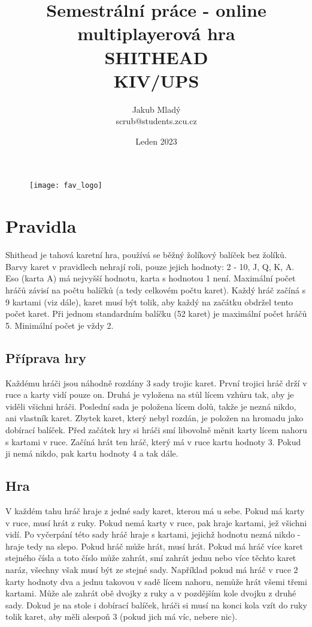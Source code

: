 \documentclass{article}
\title{%
Semestrální práce - online multiplayerová hra\\
SHITHEAD\\
\large KIV/UPS
}
\author{Jakub Mladý \\ scrub@students.zcu.cz}
\date{Leden 2023}
\begin{document}
\begin{titlingpage}
\begin{figure}
    \texttt{[image: fav\_logo]}
\end{figure}

\maketitle
\end{titlingpage}

\tableofcontents
\newpage


\section{Pravidla}
Shithead je tahová karetní hra, používá se běžný žolíkový balíček bez žolíků. Barvy karet v pravidlech nehrají roli, pouze jejich hodnoty: 2 - 10, J, Q, K, A. Eso (karta A) má nejvyšší hodnotu, karta s hodnotou 1 není. Maximální počet hráčů závisí na počtu balíčků (a tedy celkovém počtu karet). Každý hráč začíná s 9 kartami (viz dále), karet musí být tolik, aby každý na začátku obdržel tento počet karet. Při jednom standardním balíčku (52 karet) je maximální počet hráčů 5. Minimální počet je vždy 2.

\subsection{Příprava hry}
Každému hráči jsou náhodně rozdány 3 sady trojic karet. První trojici hráč drží v ruce a karty vidí pouze on. Druhá je vyložena na stůl lícem vzhůru tak, aby je viděli všichni hráči. Poslední sada je položena lícem dolů, takže je nezná nikdo, ani vlastník karet. Zbytek karet, který nebyl rozdán, je položen na hromadu jako dobírací balíček. Před začátek hry si hráči smí libovolně měnit karty lícem nahoru s kartami v ruce. Začíná hrát ten hráč, který má v ruce kartu hodnoty 3. Pokud ji nemá nikdo, pak kartu hodnoty 4 a tak dále.

\subsection{Hra}
V každém tahu hráč hraje z jedné sady karet, kterou má u sebe. Pokud má karty v ruce, musí hrát z ruky. Pokud nemá karty v ruce, pak hraje kartami, jež všichni vidí. Po vyčerpání této sady hráč hraje s kartami, jejichž hodnotu nezná nikdo - hraje tedy na slepo. Pokud hráč může hrát, musí hrát. Pokud má hráč více karet stejného čísla a toto číslo může zahrát, smí zahrát jednu nebo více těchto karet naráz, všechny však musí být ze stejné sady. Například pokud má hráč v ruce 2 karty hodnoty dva a jednu takovou v sadě lícem nahoru, nemůže hrát všemi třemi kartami. Může ale zahrát obě dvojky z ruky a v pozdějším kole dvojku z druhé sady. Dokud je na stole i dobírací balíček, hráči si musí na konci kola vzít do ruky tolik karet, aby měli alespoň 3 (pokud jich má víc, nebere nic).
\end{document}
